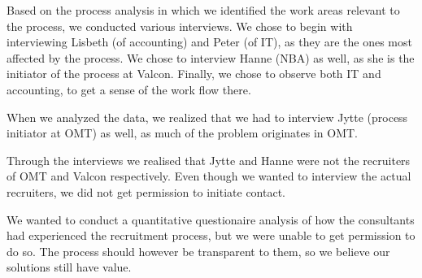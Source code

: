Based on the process analysis in which we identified the work areas relevant to the process, we conducted various interviews.
We chose to begin with interviewing Lisbeth (of accounting) and Peter (of IT), as they are the ones most affected by the process.
We chose to interview Hanne (NBA) as well, as she is the initiator of the process at Valcon.
Finally, we chose to observe both IT and accounting, to get a sense of the work flow there.

When we analyzed the data, we realized that we had to interview Jytte (process initiator at OMT) as well, as much of the problem originates in OMT.

Through the interviews we realised that Jytte and Hanne were not the recruiters of OMT and Valcon respectively. Even though we wanted to interview the actual recruiters, we did not get permission to initiate contact.

We wanted to conduct a quantitative questionaire analysis of how the consultants had experienced the recruitment process, but we were unable to get permission to do so.
The process should however be transparent to them, so we believe our solutions still have value.